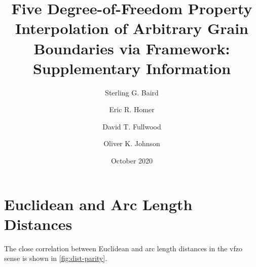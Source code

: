 \documentclass[preprint,12pt]{elsarticle}
\begin{document}
\begin{frontmatter}

\title{Five Degree-of-Freedom Property Interpolation of Arbitrary Grain Boundaries via  Framework: Supplementary Information}

\author[myu]{Sterling G. Baird}
\author[myu]{Eric R. Homer}
\author[myu]{David T. Fullwood}
\author[myu]{Oliver K. Johnson}

\address[myu]{Department of Mechanical Engineering, Brigham Young University, Provo, UT 84602, USA}


\date{October 2020}
\end{frontmatter}

\section{Euclidean and Arc Length Distances}
\label{sec:supp:dist-parity}
The close correlation between Euclidean and arc length distances in the \gls{vfzo} sense is shown in \cref{fig:dist-parity}.
\end{document}
